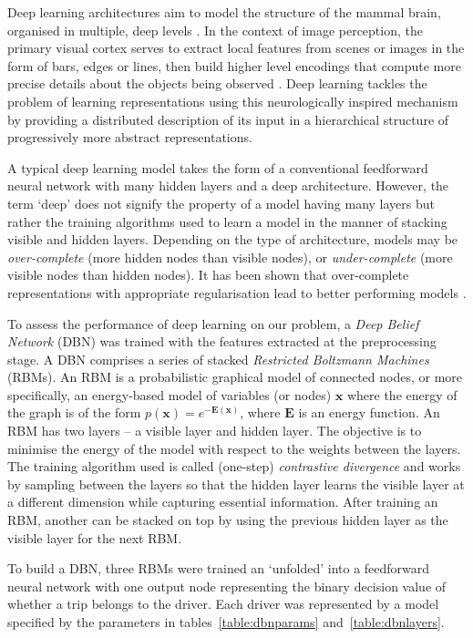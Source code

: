 \documentclass[a4paper, 11pt, twocolumn]{report}
\begin{document}
Deep learning architectures aim to model the structure of the mammal brain, organised in multiple, deep levels \cite{serre2007quantitative}.
In the context of image perception, the primary visual cortex serves to extract local features from scenes or images in the form of bars, edges or lines, then build higher level encodings that compute more precise details about the objects being observed \cite{lee1998role}.
Deep learning tackles the problem of learning representations using this neurologically inspired mechanism by providing a distributed description of its input in a hierarchical structure of progressively more abstract representations.

A typical deep learning model takes the form of a conventional feedforward neural network with many hidden layers and a deep architecture.
However, the term `deep' does not signify the property of a model having many layers but rather the training algorithms used to learn a model in the manner of stacking visible and hidden layers.
Depending on the type of architecture, models may be \textit{over-complete} (more hidden nodes than visible nodes), or \textit{under-complete} (more visible nodes than hidden nodes).
It has been shown that over-complete representations with appropriate regularisation lead to better performing models \cite{vincent2010stacked}.

To assess the performance of deep learning on our problem, a \textit{Deep Belief Network} (DBN) was trained with the features extracted at the preprocessing stage.
A DBN comprises a series of stacked \textit{Restricted Boltzmann Machines} (RBMs).
An RBM is a probabilistic graphical model of connected nodes, or more specifically, an energy-based model of variables (or nodes) $\mathbf{x}$ where the energy of the graph is of the form $p(\mathbf{x})=e^{\mathbf{-E(x)}}$, where $\mathbf{E}$ is an energy function.
An RBM has two layers -- a visible layer and hidden layer.
The objective is to minimise the energy of the model with respect to the weights between the layers.
The training algorithm used is called (one-step) \textit{contrastive divergence} \cite{hinton2002training} and works by sampling between the layers so that the hidden layer learns the visible layer at a different dimension while capturing essential information.
After training an RBM, another can be stacked on top by using the previous hidden layer as the visible layer for the next RBM.

To build a DBN, three RBMs were trained an `unfolded' into a feedforward neural network with one output node representing the binary decision value of whether a trip belongs to the driver.
Each driver was represented by a model specified by the parameters in tables~\ref{table:dbnparams} and~\ref{table:dbnlayers}.
\end{document}
